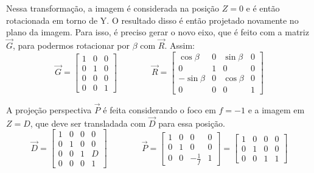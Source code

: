     Nessa transformação, a imagem é considerada na posição $Z = 0$ e é então rotacionada em torno de Y. O resultado disso é então projetado novamente no plano da imagem. Para isso, é preciso gerar o novo eixo, que é feito com a matriz $\vec{G}$, para podermos rotacionar por $\beta$ com $\vec{R}$. Assim:
    \[
        \vec{G} = \begin{bmatrix}
            1 & 0 & 0 \\
            0 & 1 & 0 \\
            0 & 0 & 0 \\
            0 & 0 & 1
        \end{bmatrix}
        \qquad \qquad
        \vec{R} = \begin{bmatrix}
            \cos\beta & 0 & \sin\beta & 0 \\
            0 & 1 & 0 & 0 \\
            -\sin\beta & 0 & \cos\beta & 0 \\
            0 & 0 & 0 & 1
        \end{bmatrix}
    \]

    A projeção perspectiva $\vec{P}$ é feita considerando o foco em $f = -1$ e a imagem em $Z = D$, que deve ser transladada com $\vec{D}$ para essa posição.
    \[
        \vec{D} = \begin{bmatrix}
            1 & 0 & 0 & 0 \\
            0 & 1 & 0 & 0 \\
            0 & 0 & 1 & D\\
            0 & 0 & 0 & 1
        \end{bmatrix}
        \qquad \qquad
        \vec{P} = \begin{bmatrix}
            1 & 0 & 0 & 0 \\
            0 & 1 & 0 & 0 \\
            0 & 0 & -\frac{1}{f} & 1
        \end{bmatrix} = \begin{bmatrix}
            1 & 0 & 0 & 0 \\
            0 & 1 & 0 & 0 \\
            0 & 0 & 1 & 1
        \end{bmatrix}
    \]


